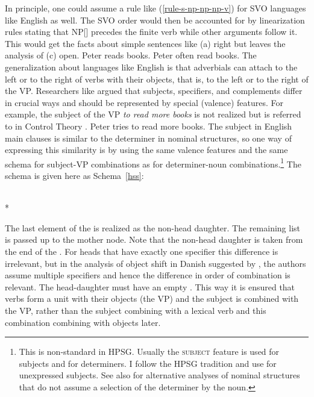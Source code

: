 \documentclass[output=paper
                ,modfonts
                ,nonflat
	        ,collection
	        ,collectionchapter
	        ,collectiontoclongg
 	        ,biblatex
                ,babelshorthands
                ,newtxmath
                ,draftmode
                ,colorlinks, citecolor=brown
]{./langsci/langscibook}
\begin{document}
In principle, one could assume a rule like (\ref{rule-s-np-np-np-v}) for SVO languages like English
as well. The SVO order would then be accounted for by linearization rules stating that
NP[] precedes the finite verb while other arguments follow it. This would get the facts
about simple sentences like (a) right but leaves the analysis of (c) open.
\eal
\ex Peter reads books.
\ex Peter often read books.
\zl
The generalization about languages like English is that adverbials can attach to the left or to the
right of verbs with their objects, that is, to the left or to the right of the VP. Researchers like
\citet{Borsley87a} argued that subjects, specifiers, and complements differ in crucial ways and
should be represented by special (valence) features. For example, the subject of the VP \emph{to read
 more books} is not realized but is referred to in Control Theory .
\ea
Peter tries to read more books.
\z 
The subject in English main clauses is similar to the determiner in nominal structures, so one
way of expressing this similarity is by using the same valence features and the same schema for
subject-VP combinations as for determiner-noun combinations.\footnote{
  This is non-standard in HPSG. Usually the \textsc{subject} feature is used for subjects and \spr
  for determiners. I follow the  HPSG tradition and use \subj for unexpressed subjects. See
  also  for alternative analyses of nominal structures that do not assume a
  selection of the determiner by the noun.%
}
The schema is given here as Schema~\ref{hss}:

\begin{schema}\label{hss}
 \impl\\*
\end{schema}
The last element of the \sprl is realized as the non-head daughter. The remaining list is passed up
to the mother node. 
Note that the non-head daughter is taken from the end of the \sprl. For heads that have exactly one specifier this
difference is irrelevant, but in the analysis of object shift in Danish suggested by \citet{MOe2013b},
the authors assume multiple specifiers and hence the difference in order of combination is
relevant. The head-daughter must have an empty \compsl. This way it is ensured that verbs form a
unit with their objects (the VP) and the subject is combined with the VP, rather than the subject
combining with a lexical verb and this combination combining with objects later.
\end{document}
